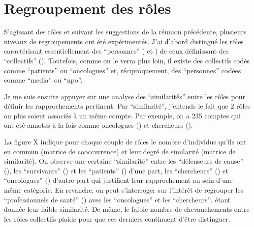 \documentclass[letterpaper,10pt,english]{jupyterBook}
\begin{document}
\section{Regroupement des rôles}
\label{\detokenize{regroupement_categorie:regroupement-des-roles}}\label{\detokenize{regroupement_categorie::doc}}
\sphinxAtStartPar
S’agissant des rôles et suivant les suggestions de la réunion précédente, plusieurs niveaux de regroupements ont été expérimentés. J’ai d’abord distingué les rôles caractérisant essentiellement des “personnes” ( et )  de ceux définissant des “collectifs” (). Toutefois, comme on le verra plus loin, il existe des collectifs codés comme “patients” ou “oncologues” et, réciproquement, des “personnes” codées comme “media” ou “npo”.

\sphinxAtStartPar
Je me suis ensuite appuyer sur une analyse des “similarités” entre les rôles pour définir les rapprochements pertinent. Par “similarité”, j’entends le fait que 2 rôles ou plus soient associés à un même compte. Par exemple, on a 235 comptes qui ont été annotés à la fois comme oncologues () et chercheurs ().

\sphinxAtStartPar
La figure X indique pour chaque couple de rôles le nombre d’individus qu’ils ont en commun (matrice de co\sphinxhyphen{}occurrence) et leur degré de similarité (matrice de similarité). On observe une certaine “similarité” entre les “défenseurs de cause” (), les “survivants” () et les “patients” () d’une part, les “chercheurs” () et “oncologues” () d’autre part qui justifient leur rapprochement au sein d’une même catégorie. En revanche, on peut s’interroger sur l’intérêt de regrouper les “professionnels de santé” () avec les “oncologues” et les “chercheurs”, étant donnée leur faible similarité. De même, le faible nombre de chevauchements entre les rôles collectifs plaide pour que ces derniers continuent d’être distinguer.

\sphinxAtStartPar
{}
\end{document}
